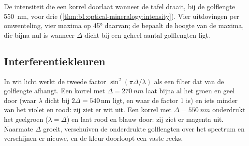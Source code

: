 \begin{omfigure}

{\small De intensiteit die een korrel doorlaat wanneer de tafel draait, bij de golflengte \qty{550}{nm}, voor drie 
(\cref{thm:b1:optical-mineralogy:intensity}). Vier uitdovingen per omwenteling, vier maxima op \ang{45} daarvan; de  bepaalt de hoogte van de
maxima, die bijna nul is wanneer $\Delta$ dicht bij een geheel aantal golflengten ligt.}
\end{omfigure}

\subsection{Interferentiekleuren}

In wit licht werkt de tweede factor $\sin^2(\pi\Delta/\lambda)$ als een filter dat van de golflengte afhangt. Een korrel met $\Delta = \qty{270}{nm}$
laat bijna al het groen en geel door (waar $\lambda$ dicht bij $2\Delta = 540$\,nm ligt, en waar de factor 1 is) en iets minder van het violet en rood:
zij ziet er wit uit. Een korrel met $\Delta = \qty{550}{nm}$ onderdrukt het geelgroen ($\lambda = \Delta$) en laat rood en blauw door: zij ziet er
magenta uit. Naarmate $\Delta$ groeit, verschuiven de onderdrukte golflengten over het spectrum en verschijnen er nieuwe, en de kleur doorloopt een vaste reeks.

